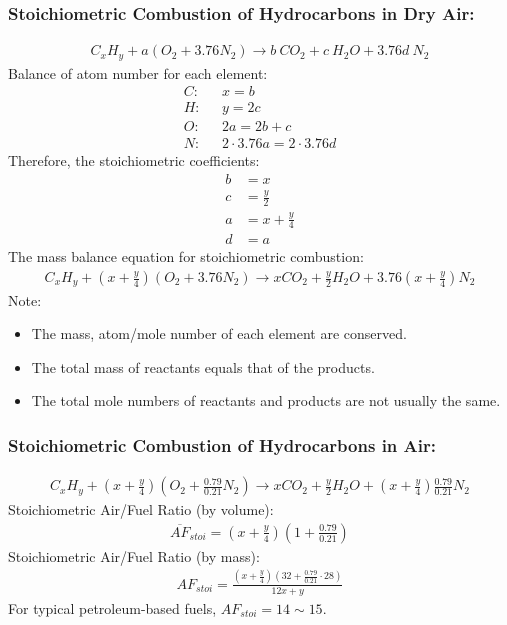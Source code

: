 \subsubsection{Stoichiometric Combustion of Hydrocarbons in Dry Air:}
\begin{gather}
  C_xH_y + a(O_2 + 3.76N_2) \longrightarrow b\ CO_2 + c\ H_2O + 3.76d\ N_2
\end{gather}
Balance of atom number for each element:
\begin{align}
  C: \ \ \  & x = b                       \\[5pt]
  H: \ \ \  & y = 2c                      \\[5pt]
  O: \ \ \  & 2a = 2b + c                 \\[5pt]
  N: \ \ \  & 2\cdot 3.76a = 2\cdot 3.76d
\end{align}
Therefore, the stoichiometric coefficients:
\begin{align}
  b & = x               \\[5pt]
  c & = \frac{y}{2}     \\[5pt]
  a & = x + \frac{y}{4} \\[5pt]
  d & = a
\end{align}
The mass balance equation for stoichiometric combustion:
\begin{gather}
  C_xH_y + \left(x+\frac{y}{4}\right)(O_2 + 3.76N_2) \longrightarrow xCO_2 + \frac{y}{2}H_2O + 3.76\left(x+\frac{y}{4}\right)N_2
\end{gather}
Note:
\begin{itemize}[noitemsep]
  \item The mass, atom/mole number of each element are conserved.
  \item The total mass of reactants equals that of the products.
  \item The total mole numbers of reactants and products are not usually the same.
\end{itemize}
\subsubsection{Stoichiometric Combustion of Hydrocarbons in Air:}
\begin{gather}
  C_xH_y + \left(x+\frac{y}{4}\right) \left(O_2 + \frac{0.79}{0.21}N_2\right) \longrightarrow xCO_2 + \frac{y}{2}H_2O + \left(x+\frac{y}{4}\right)\frac{0.79}{0.21}N_2
\end{gather}
Stoichiometric Air/Fuel Ratio (by volume):
\begin{gather}
  \overline{AF}_{stoi} = \left(x+\frac{y}{4}\right)\left(1+\frac{0.79}{0.21}\right)
\end{gather}
Stoichiometric Air/Fuel Ratio (by mass):
\begin{gather}
  AF_{stoi} = \frac{\left(x+\frac{y}{4}\right) \left(32+\frac{0.79}{0.21}\cdot 28\right)}{12x + y}
\end{gather}
For typical petroleum-based fuels, $AF_{stoi} = 14 \sim 15$.
